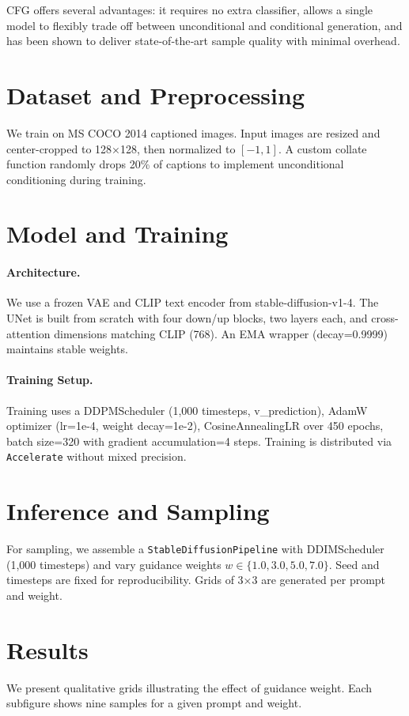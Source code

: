 \documentclass[11pt,a4paper]{article}
\begin{document}
CFG offers several advantages: it requires no extra classifier, allows a single model to flexibly trade off between unconditional and conditional generation, and has been shown to deliver state‐of‐the‐art sample quality with minimal overhead.



\section{Dataset and Preprocessing}
We train on MS COCO 2014 captioned images. Input images are resized and center-cropped to 128×128, then normalized to $[-1,1]$. A custom collate function randomly drops 20\% of captions to implement unconditional conditioning during training.

\section{Model and Training}
\paragraph{Architecture.} We use a frozen VAE and CLIP text encoder from stable-diffusion-v1-4. The UNet is built from scratch with four down/up blocks, two layers each, and cross-attention dimensions matching CLIP (768). An EMA wrapper (decay=0.9999) maintains stable weights.

\paragraph{Training Setup.} Training uses a DDPMScheduler (1,000 timesteps, v\_prediction), AdamW optimizer (lr=1e-4, weight decay=1e-2), CosineAnnealingLR over 450 epochs, batch size=320 with gradient accumulation=4 steps. Training is distributed via \texttt{Accelerate} without mixed precision.

\section{Inference and Sampling}
For sampling, we assemble a \texttt{StableDiffusionPipeline} with DDIMScheduler (1,000 timesteps) and vary guidance weights $w\in\{1.0,3.0,5.0, 7.0\}$. Seed and timesteps are fixed for reproducibility. Grids of 3×3 are generated per prompt and weight.

\section{Results}
We present qualitative grids illustrating the effect of guidance weight. Each subfigure shows nine samples for a given prompt and weight.
\end{document}

